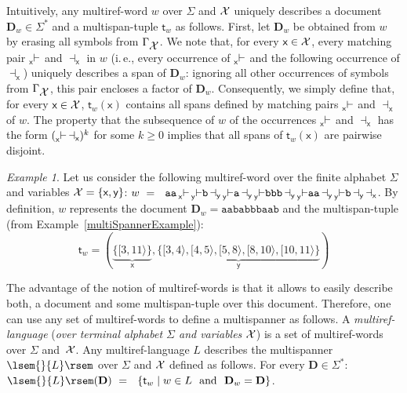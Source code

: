 \documentclass[
a4paper
]{article}
\theoremstyle{plain}
\theoremstyle{definition}
\theoremstyle{remark}
\newtheorem{example}[theorem]{Example}
\newcommand{\varset}{\mbox{\ensuremath{\mathcal{X}}}}
\DeclareMathOperator{\openmark}{\vdash}
\DeclareMathOperator{\closemark}{\dashv}
\newcommand{\doc}{\ensuremath{\mathbf{D}}}
\newcommand{\spann}[2]{\ensuremath{[#1,#2\rangle}}
\newcommand{\open}[1]{\prescript{}{#1}{\openmark}}
\newcommand{\close}[1]{\closemark_{#1}}
\newcommand{\getDoc}[1]{\doc_{#1}}
\newcommand{\getSpanTuple}[1]{\textsf{t}_{#1}}
\newcommand{\ta}{\ensuremath{\mathtt{a}}}
\newcommand{\tb}{\ensuremath{\mathtt{b}}}
\newcommand{\varsx}{\ensuremath{\textsf{x}}}
\newcommand{\varsy}{\ensuremath{\textsf{y}}}
\newcommand{\sem}[1]{{\lsem{}{#1}\rsem}}
\begin{document}
Intuitively, any multiref-word $w$ over $\Sigma$ and $\varset$
uniquely describes a document $\getDoc{w} \in \Sigma^*$ and a
multispan-tuple $\getSpanTuple{w}$ as follows. First, let $\getDoc{w}$
be obtained from $w$
by erasing all symbols from $\Gamma_{\varset}$. We note that, for every $\varsx \in \varset$, every matching pair $\open{\varsx}$ and $\close{\varsx}$ in $w$ (i.\,e., every occurrence of $\open{\varsx}$ and the following occurrence of $\close{\varsx}$) uniquely describes a span of $\getDoc{w}$: ignoring all other occurrences of symbols from $\Gamma_{\varset}$, this pair encloses a factor of $\getDoc{w}$.  Consequently, we simply define that, for every $\varsx \in \varset$, $\getSpanTuple{w}(\varsx)$ contains all spans defined by matching pairs $\open{\varsx}$ and $\close{\varsx}$ of $w$. The property that the subsequence of $w$ of the occurrences $\open{\varsx}$ and $\close{\varsx}$ has the form $(\open{\varsx} \close{\varsx})^k$ for some $k \geq 0$ implies that all spans of $\getSpanTuple{w}(\varsx)$ are pairwise disjoint.

\begin{example}
Let us consider the following multiref-word over the finite alphabet $\Sigma$ and variables $\varset = \{\varsx, \varsy\}$: $w \ = \ \  \ta \ta \open{\varsx} \open{\varsy} \tb \close{\varsy} \open{\varsy} \ta \close{\varsy} \open{\varsy} \tb \tb \tb \close{\varsy} \open{\varsy} \ta \ta \close{\varsy} \open{\varsy} \tb \close{\varsy} \close{\varsx}$. By definition, $w$ represents the document $\getDoc{w} = \ta \ta \tb \ta \tb \tb \tb \ta \ta \tb$ and the multispan-tuple (from Example~\ref{multiSpannerExample}):
\begin{equation*}
\getSpanTuple{w} = (\underbrace{\{\spann{3}{11}\}}_{\varsx}, \underbrace{\{\spann{3}{4}, \spann{4}{5}, \spann{5}{8}, \spann{8}{10}, \spann{10}{11}\}}_{\varsy})
\end{equation*}
\end{example}

The advantage of the notion of
multiref-words is that it allows to easily
describe both,
a document and some multispan-tuple
over this document.
Therefore,
one can use any set of multiref-words to define a multispanner as follows.
A \emph{multiref-language} (\emph{over terminal alphabet $\Sigma$ and variables $\varset$}) is a set of multiref-words over $\Sigma$ and~$\varset$.
Any multiref-language $L$
describes the multispanner $\sem{L}$ over $\Sigma$ and $\varset$ defined as follows. For every $\doc \in \Sigma^*$: $\sem{L}(\doc) \ = \ \  \{\getSpanTuple{w} \mid w \in L \text{ \ and \ } \getDoc{w} = \doc\}$.
\end{document}
